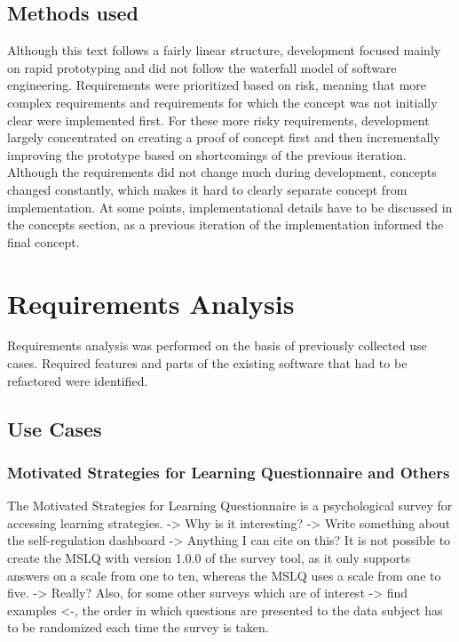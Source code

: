 \documentclass[a4paper,11pt]{article}
\begin{document}
        \subsection{Methods used}
            Although this text follows a fairly linear structure, development focused
            mainly on rapid prototyping and did not follow the waterfall model of
            software engineering. Requirements were prioritized
            based on risk, meaning that more complex requirements and requirements for
            which the concept was not initially clear were implemented first.
            For these more risky requirements, development largely concentrated
            on creating a proof of concept first and then incrementally improving
            the prototype based on shortcomings of the previous iteration.
            Although the requirements did not change much during development,
            concepts changed constantly, which makes it hard to clearly
            separate concept from implementation. At some points, implementational
            details have to be discussed in the concepts section, as a previous
            iteration of the implementation informed the final concept.

        \section{Requirements Analysis}
           Requirements analysis was performed on the basis of previously collected use cases.
           Required features and parts of the existing software that
           had to be refactored were identified.

           \subsection{Use Cases}

                \subsubsection{Motivated Strategies for Learning Questionnaire and Others}
                The Motivated Strategies for Learning Questionnaire is a psychological survey for accessing
                learning strategies. 
                -> Why is it interesting? 
                -> Write something about the self-regulation dashboard
                -> Anything I can cite on this?
                It is not possible to create the MSLQ with version 1.0.0 of the survey tool,
                as it only supports answers on a scale from one to ten, whereas the MSLQ uses
                a scale from one to five. -> Really?
                Also, for some other surveys which are of interest -> find examples <-,
                the order in which questions are presented to the data subject has to
                be randomized each time the survey is taken.
                
\end{document}
